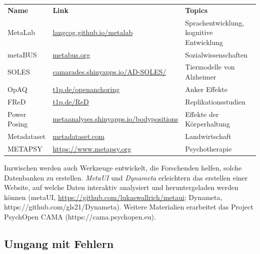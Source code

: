 \documentclass[
  letterpaper,
  DIV=11,
  numbers=noendperiod]{scrreprt}
\begin{document}
\begin{longtable}[]{@{}
  >{\raggedright\arraybackslash}p{}
  >{\raggedright\arraybackslash}p{}
  >{\raggedright\arraybackslash}p{}@{}}
\toprule\noalign{}
\endhead
\bottomrule\noalign{}
\endlastfoot
\textbf{Name} & \textbf{Link} & \textbf{Topics} \\
MetaLab &
\href{https://langcog.github.io/metalab}{langcog.github.io/metalab} &
Sprachentwicklung, kognitive Entwicklung \\
metaBUS & \href{http://metabus.org/}{metabus.org} &
Sozialwissenschaften \\
SOLES &
\href{https://camarades.shinyapps.io/AD-SOLES/}{camarades.shinyapps.io/AD-SOLES/}
& Tiermodelle von Alzheimer \\
OpAQ & \href{https://t1p.de/openanchoring}{t1p.de/openanchoring} & Anker
Effekte \\
FReD & \href{https://t1p.de/ReD}{t1p.de/ReD} & Replikationsstudien \\
Power Posing &
\href{https://metaanalyses.shinyapps.io/bodypositions/}{metaanalyses.shinyapps.io/bodypositions}
& Effekte der Körperhaltung \\
Metadataset & \href{https://www.metadataset.com/}{metadataset.com} &
Landwirtschaft \\
METAPSY & \url{https://www.metapsy.org} & Psychotherapie \\
\end{longtable}

Inzwischen werden auch Werkzeuge entwickelt, die Forschenden helfen,
solche Datenbanken zu erstellen. \emph{MetaUI} und \emph{Dynameta}
erleichtern das erstellen einer Website, auf welche Daten interaktiv
analysiert und heruntergeladen werden können (metaUI,
\url{https://github.com/lukaswallrich/metaui}; Dynameta,
https://github.com/gls21/Dynameta). Weitere Materialien erarbeitet das
Project PsychOpen CAMA (https://cama.psychopen.eu).

\subsection{Umgang mit Fehlern}\label{umgang-mit-fehlern}
\end{document}
